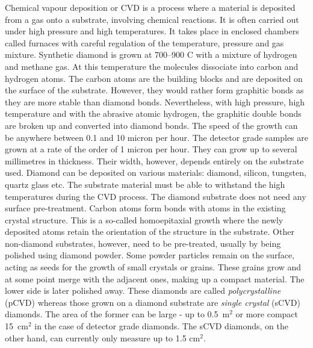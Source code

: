 \documentclass[twoside,12pt]{packages/mytustyle}  %
\let\origdescription\description
\renewenvironment{description}{
  \setlength{\leftmargini}{0em}
  \origdescription
  \setlength{\itemindent}{0em}
  \setlength{\labelsep}{\textwidth}
}
{\endlist}
\begin{document}
\begin{description}
\item[Chemical vapour deposition] Chemical vapour deposition or CVD is a process where a material is deposited from a gas onto a substrate, involving chemical reactions. It is often carried out under high pressure and high temperatures. It takes place in enclosed chambers called furnaces with careful regulation of the temperature, pressure and gas mixture. Synthetic diamond is grown at 700--900 \textdegree C with a mixture of hydrogen and methane gas. At this temperature the molecules dissociate into carbon and hydrogen atoms. The carbon atoms are the building blocks and are deposited on the surface of the substrate. However, they would rather form graphitic bonds as they are more stable than diamond bonds. Nevertheless, with high pressure, high temperature and with the abrasive atomic hydrogen, the graphitic double bonds are broken up and converted into diamond bonds. The speed of the growth can be anywhere between 0.1 and 10 micron per hour. The detector grade samples are grown at a rate of the order of 1 micron per hour. They can grow up to several millimetres in thickness. Their width, however, depends entirely on the substrate used. Diamond can be deposited on various materials: diamond, silicon, tungsten, quartz glass etc. The substrate material must be able to withstand the high temperatures during the CVD process. The diamond substrate does not need any surface pre-treatment. Carbon atoms form bonds with atoms in the existing crystal structure. This is a so-called homoepitaxial growth where the newly deposited atoms retain the orientation of the structure in the substrate. Other non-diamond substrates, however, need to be pre-treated, usually by being polished using diamond powder. Some powder particles remain on the surface, acting as seeds for the growth of small crystals or grains. These grains grow and at some point merge with the adjacent ones, making up a compact material. The lower side is later polished away. These diamonds are called \emph{polycrystalline} (pCVD) whereas those grown on a diamond substrate are \emph{single crystal} (sCVD) diamonds. The area of the former can be large - up to 0.5~m$^2$ or more compact 15~cm$^2$ in the case of detector grade diamonds. The sCVD diamonds, on the other hand, can currently only measure up to 1.5 cm$^2$.
\end{description}





\end{document}
